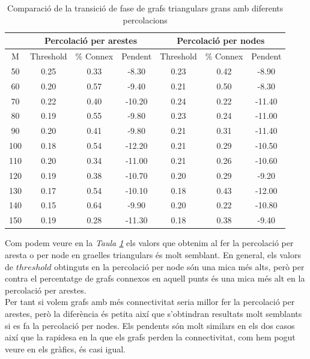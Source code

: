 \documentclass[a4paper]{article}
\begin{document}
	\begin{table}[H]
		\centering
		\begin{tabular}{|c|c|c|c|c|c|c|}
			\hline
			\rowcolor{gray!30}
			\multicolumn{1}{|c|}{} &\multicolumn{3}{|c|}{Percolació per arestes} & \multicolumn{3}{|c|}{Percolació per nodes} \\ \hline
			\rowcolor{gray!30}
			M & Threshold & \% Connex & Pendent & Threshold & \% Connex & Pendent \\ \hline
			50 & 0.25 & 0.33 & -8.30 & 0.23 & 0.42 & -8.90	\\ \hline
			60 & 0.20 & 0.57 & -9.40 & 0.21 & 0.50 & -8.30	\\ \hline
			70 & 0.22 & 0.40 & -10.20 & 0.24 & 0.22 & -11.40	\\ \hline
			80 & 0.19 & 0.55 & -9.80 & 0.23 & 0.24 & -11.00	\\ \hline
			90 & 0.20 & 0.41 & -9.80 & 0.21 & 0.31 & -11.40	\\ \hline
			100 & 0.18 & 0.54 & -12.20 & 0.21 & 0.29 & -10.50	\\ \hline
			110 & 0.20 & 0.34 & -11.00 & 0.21 & 0.26 & -10.60	\\ \hline
			120 & 0.19 & 0.38 & -10.70 & 0.20 & 0.29 & -9.20	\\ \hline
			130 & 0.17 & 0.54 & -10.10 & 0.18 & 0.43 & -12.00	\\ \hline
			140 & 0.15 & 0.64 & -9.90  & 0.20 & 0.22 & -10.80	\\ \hline
			150 & 0.19 & 0.28 & -11.30 & 0.18 & 0.38 & -9.40	\\ \hline
		\end{tabular}
		\caption{Comparació de la transició de fase de grafs triangulars grans amb diferents percolacions}
		\label{tab:comparacio_edges_nodes_triangulars}
	\end{table}
	
	Com podem veure en la \textit{Taula \ref{tab:comparacio_edges_nodes_triangulars}} els valors que obtenim al fer la percolació per aresta o per node en graelles triangulars és molt semblant. En general, els valors de $threshold$ obtinguts en la percolació per node són una mica més alts, però per contra el percentatge de grafs connexos en aquell punts és una mica més alt en la percolació per arestes. \\
	
	Per tant si volem grafs amb més connectivitat seria millor fer la percolació per arestes, però la diferència és petita així que s'obtindran resultats molt semblants si es fa la percolació per nodes. Els pendents són molt similars en els dos casos així que la rapidesa en la que els grafs perden la connectivitat, com hem pogut veure en els gràfics, és casi igual.
	
\end{document}
